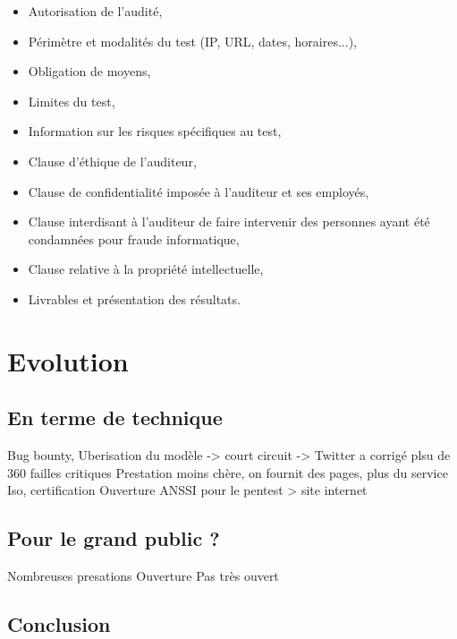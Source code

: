 \documentclass[a4paper]{memoir}
\begin{document}
	\begin{itemize}
		\item Autorisation de l'audité,
		\item Périmètre et modalités du test (IP, URL, dates, horaires...),
		\item Obligation de moyens,
		\item Limites du test,
		\item Information sur les risques spécifiques au test,
		\item Clause d'éthique de l'auditeur,
		\item Clause de confidentialité imposée à l'auditeur et ses employés,
		\item Clause interdisant à l'auditeur de faire intervenir des personnes ayant été condamnées pour fraude informatique,
		\item Clause relative à la propriété intellectuelle,
		\item Livrables et présentation des résultats.
\end{itemize}




\part{Evolution}

\chapter{En terme de technique}

Bug bounty, Uberisation du modèle -> court circuit -> Twitter a corrigé plsu de 360 failles critiques 
Prestation moins chère, on fournit des pages, plus du service
Iso, certification
Ouverture ANSSI pour le pentest > site internet 

\chapter{Pour le grand public ?}

Nombreuses presations
Ouverture
Pas très ouvert



\chapter*{Conclusion}
\end{document}
